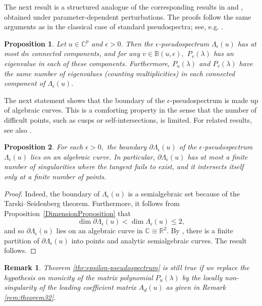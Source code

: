 \documentclass[10pt,reqno]{amsart}
\theoremstyle{break-italic}
\theoremstyle{break-italic}
\theoremstyle{break-italic}
\theoremstyle{break-italic}
\theoremstyle{break-italic}
\theoremstyle{break-italic}
\theoremstyle{break-italic}
\theoremstyle{break-italic}
\theoremstyle{break-roman}
\newtheorem{remark}[satz]{Remark}
\theoremstyle{standard}
\theoremstyle{varthm-roman}
\theoremstyle{varthm-italic}
\theoremstyle{varthm-roman-break}
\theoremstyle{varthm-italic-break}
\theoremstyle{varthm-roman-no-punctuation}
\theoremstyle{varthm-italic-no-punctuation}
\numberwithin{equation}{section}
\newtheorem{proposition}{Proposition}[section]
\begin{document}
 The next result is a structured analogue of the corresponding results in \cite[Theorem 2.3]{Lancaster2005} and \cite[Theorem~2]{Mosier1986}, obtained under parameter-dependent perturbations. The proofs follow the same arguments as in the classical case of standard pseudospectra; see, e.g. \cite[Theorem 2.3]{Lancaster2005}.
\begin{proposition}
Let ${u} \in \mathbb{C}^p$ and $\epsilon > 0.$ Then the $\epsilon$-pseudospectrum $\Lambda_\epsilon({u})$ has at most $dn $ connected components, and for any $v \in \mathbb{B}({u}, \epsilon),$ $P_{v}(\lambda)$ has an eigenvalue in each of these components. Furthermore, $P_{{u}}(\lambda)$ and $P_{v}(\lambda)$ have the same number of eigenvalues (counting multiplicities) in each connected component of $\Lambda_\epsilon({u}).$
\end{proposition}


The next statement shows that the boundary of the $\epsilon$-pseudospectrum is made up of algebraic curves. This is a comforting property in the sense that the number of difficult points, such as cusps or self-intersections, is limited. For related results, see also \cite{Boulton2008, Lancaster2005, Tisseur2001-1}.

\begin{proposition}
For each $\epsilon > 0,$ the boundary $\partial \Lambda_\epsilon({u})$ of the $\epsilon$-pseudospectrum $\Lambda_\epsilon({u})$ lies on an algebraic curve. In particular, $\partial \Lambda_\epsilon({u})$ has at most a finite number of singularities where the tangent fails to exist, and it intersects itself only at a finite number of points.
\end{proposition}

\begin{proof}
Indeed, the boundary of $\Lambda_\epsilon({u})$ is a semialgebraic set because of the Tarski--Seidenberg theorem.
Furthermore, it follows from Proposition~\ref{DimensionProposition} that
$$\dim \partial \Lambda_\epsilon({u}) < \dim \Lambda_\epsilon({u}) \le 2,$$
and so $\partial \Lambda_\epsilon({u})$ lies on an algebraic curve in $\mathbb{C} \equiv \mathbb{R}^2.$ By \cite[Theorem~1.1]{HP2017}, there is a finite partition of $\partial \Lambda_\epsilon({u})$ into points and analytic semialgebraic curves. The result follows.
\end{proof}


 \begin{remark} \label{rem:theorem33}\rm Theorem \ref{thr:epsilon-pseudospectrum} is still true if we replace the hypothesis on monicity of the matrix polynomial $P_u(\lambda)$ by the locally non-singularity of the leading coefficient matrix $A_d(u)$ as given in Remark \ref{rem:theorem32}.
\end{remark}
\end{document}
